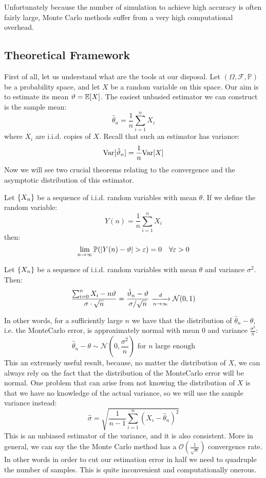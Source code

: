 Unfortunately because the number of simulation to achieve high accuracy is
often fairly large, Monte Carlo methods suffer from a very high computational
overhead.

\subsection{Theoretical Framework}

First of all, let us understand what are the tools at our disposal.
Let $(\Omega, \mathcal{F}, \mathbb{P})$ be a probability space, and let $X$
be a random variable on this space. Our aim is to estimate its mean $\theta = 
\E[X]$. The easiest unbasied estimator we can construct is the sample mean:
\[ \hat{\theta}_n = \frac{1}{n} \sum_{i=1}^n X_i \]
where $X_i$ are i.i.d. copies of $X$.
Recall that such an estimator has variance:
\[ \Var[\hat{\theta}_n] = \frac{1}{n} \Var[X] \]
Now we will see two crucial theorems relating to the convergence and the
asymptotic distribution of this estimator.

\begin{theorem*}
Let $\seq{X}$ be a sequence of i.i.d. random variables with mean $\theta$.
If we define the random variable:
\[ Y(n) = \frac{1}{n} \sum_{i=1}^n X_i \]
then:
\[ \lim_{n\to\infty} \P(|Y(n) - \theta| > \epsilon) = 0 \quad \forall \epsilon
> 0 \]
\end{theorem*}

\begin{theorem*}
Let $\seq{X}$ be a sequence of i.i.d. random variables with mean $\theta$ and
variance $\sigma^2$. Then:
\[ \frac{\sum_{i=0}^n X_i - n\theta}{\sigma\cdot\sqrt{n}} = \frac{\hat{\theta}_n
- \theta}{\sigma / \sqrt{n}} \toin{d} \mathcal{N}(0,1) \]
\end{theorem*}

In other words, for a sufficiently large $n$ we have that the distribution of
$\hat{\theta}_n - \theta$, i.e. the MonteCarlo error, is approximately normal
with mean $0$ and variance $\frac{\sigma^2}{n}$:
\[ \hat{\theta}_n - \theta \sim \mathcal{N}\left(0, \frac{\sigma^2}{n}\right) 
\text{ for } n \text{ large enough}\]
This an extremely useful result, because, no matter the distribution of $X$,
we can always rely on the fact that the distribution of the MonteCarlo error
will be normal.
One problem that can arise from not knowing the distribution of $X$ is that we
have no knowledge of the actual variance, so we will use the sample variance
instead:
\[ \hat{\sigma} = \sqrt{\frac{1}{n-1} \sum_{i=1}^n (X_i - \hat{\theta}_n)^2}\]
This is an unbiased estimator of the variance, and it is also consistent.
More in general, we can say the the Monte Carlo method has a
$\mathcal{O}\left(\frac{1}{\sqrt{n}}\right)$ convergence rate.
In other words in order to cut our estimation error in half we need to 
quadruple the number of samples. This is quite inconvenient and computationally
onerous.

